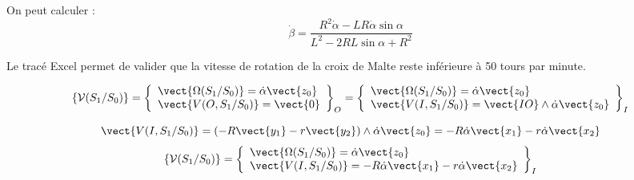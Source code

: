 \ifprof
\begin{corrige}

On peut calculer : 
$$
\dot{\beta} = \dfrac{R^2\dot{\alpha} - LR\dot{\alpha}\sin\alpha }{L^2-2RL\sin\alpha + R^2}
$$

Le tracé Excel permet de valider que la vitesse de rotation de la croix de Malte reste inférieure à 50 tours par minute.

\end{corrige}
\else\fi


\ifprof
\begin{corrige}

$$\{\mathcal{V}(S_1/S_0)\} = 
\left\{
\begin{array}{l}
\vect{\Omega(S_1/S_0)} = \dot{\alpha}\vect{z_0} \\
\vect{V(O,S_1/S_0)} = \vect{0}
\end{array}
\right\}_O =
\left\{
\begin{array}{l}
\vect{\Omega(S_1/S_0)} = \dot{\alpha}\vect{z_0} \\
\vect{V(I,S_1/S_0)} = \vect{IO} \wedge \dot{\alpha}\vect{z_0}
\end{array}
\right\}_I
$$

$$
\vect{V(I,S_1/S_0)} =\left( -R\vect{y_1} - r \vect{y_2} \right) \wedge \dot{\alpha}\vect{z_0} =- R\dot{\alpha}\vect{x_1} - r\dot{\alpha}\vect{x_2}
$$
$$\{\mathcal{V}(S_1/S_0)\} = 
\left\{
\begin{array}{l}
\vect{\Omega(S_1/S_0)} = \dot{\alpha}\vect{z_0} \\
\vect{V(I,S_1/S_0)} = -R\dot{\alpha}\vect{x_1} - r\dot{\alpha}\vect{x_2}
\end{array}
\right\}_I
$$

\end{corrige}
\else\fi

